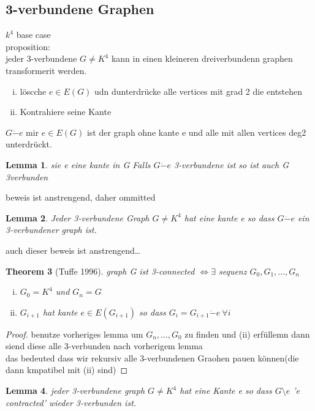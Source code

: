 \documentclass[a4paper]{article}
\newtheorem{theorem}{Theorem}[section]
\newtheorem{lemma}[theorem]{Lemma}
\theoremstyle{definition}
\theoremstyle{remark}
\begin{document}
\subsection{3-verbundene Graphen}
\label{sub:3_verbundene_graphen}

$k^4$  
base case\\ 
proposition:\\
jeder 3-verbundene $G\neq K^4$ kann in einen kleineren dreiverbundenn graphen transformerit werden.
\begin{enumerate}[(i)]
  \item löscche $e\in E(G)$ udn dunterdrücke alle vertices mit grad 2 die entstehen
  \item Kontrahiere seine Kante
\end{enumerate}
$G\dot{-} e$ mir $e\in E(G)$ ist der graph ohne kante e und alle mit allen vertices deg2 unterdrückt.
\begin{lemma}
  sie e eine kante in G Falls $G\dot{-} e$ 3-verbundene ist so ist auch G 3verbunden
\end{lemma}
beweis ist anstrengend, daher ommitted\\
\begin{lemma}
  Jeder 3-verbundene Graph $G\neq K^4$ hat eine kante e so dass $G\dot{-}e$ ein 3-verbundener graph ist.
\end{lemma}
auch dieser beweis ist anstrengend\dots\\
\begin{theorem}[Tuffe 1996]
  graph G ist 3-connected $\Leftrightarrow\exists$ sequenz $G_0,G_1,\dots,G_n$ 
  \begin{enumerate}[(i)]
    \item $G_0=K^4$ und $G_n=G$
    \item $G_{i+1}$ hat kante $ e \in E(G_{i+1}) $ so dass $G_i=G_{i+1} \dot{-} e \ \forall i$
  \end{enumerate}
\end{theorem}
\begin{proof}
  benutze vorheriges lemma um $G_n,\dots,G_0$ zu finden  und (ii) erfüllemn dann siend diese alle 3-verbunden nach vorherigem lemma\\
  das bedeuted dass wir rekursiv alle 3-verbundenen Graohen pauen können(die dann kmpatibel mit (ii) sind)


\end{proof}
\begin{lemma}
  jeder  3-verbundene graph $G\neq K^4$ hat eine Kante e so dass  $G\setminus e$ 'e contracted' wieder 3-verbunden ist.
\end{lemma}
\end{document}
